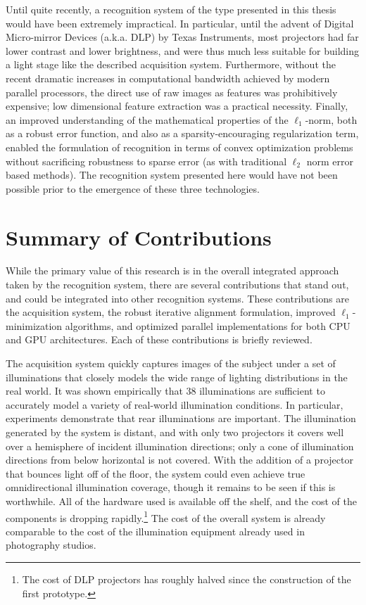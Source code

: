 Until quite recently, a recognition system of the type presented in this thesis
would have been extremely impractical.  In particular, until the advent of
Digital Micro-mirror Devices (a.k.a. DLP) by Texas Instruments, most projectors
had far lower contrast and lower brightness, and were thus much less suitable
for building a light stage like the described acquisition system.  Furthermore,
without the recent dramatic increases in computational bandwidth achieved by
modern parallel processors, the direct use of raw images as features was
prohibitively expensive; low dimensional feature extraction was a practical
necessity.  Finally, an improved understanding of the mathematical properties
of the $\ell_1$-norm, both as a robust error function, and also as a
sparsity-encouraging regularization term, enabled the formulation of recognition in
terms of convex optimization problems without sacrificing robustness to sparse
error (as with traditional $\ell_2$ norm error based methods).  The recognition
system presented here would have not been possible prior to the emergence of
these three technologies.

\section{Summary of Contributions}
While the primary value of this research is in the overall integrated approach taken by
the recognition system, there are several contributions that stand out, and could be
integrated into other recognition systems.  These contributions
are the acquisition system, the robust iterative alignment formulation,
improved $\ell_1$-minimization algorithms, and optimized parallel
implementations for both CPU and GPU architectures.  Each of these
contributions is briefly reviewed.

The acquisition system quickly captures images of the subject under a set of
illuminations that closely models the wide range of lighting distributions in
the real world.  It was shown empirically that 38 illuminations are sufficient
to accurately model a variety of real-world illumination conditions.  In
particular, experiments demonstrate that rear illuminations are important.  The
illumination generated by the system is distant, and with only two projectors
it covers well over a hemisphere of incident illumination directions; only a
cone of illumination directions from below horizontal is not covered.  With the
addition of a projector that bounces light off of the floor, the system could
even achieve true omnidirectional illumination coverage, though it remains to
be seen if this is worthwhile.  All of the hardware used is available off the
shelf, and the cost of the components is dropping rapidly.\footnote{The cost of
DLP projectors has roughly halved since the construction of the first
prototype.} The cost of the overall system is already comparable to the cost of
the illumination equipment already used in photography studios.  

